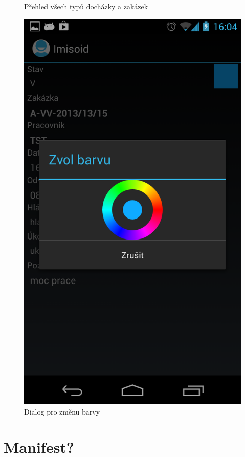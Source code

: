 \documentclass{diplomka}
\begin{document}
\begin{figure}[H]
\begin{minipage}{.45\textwidth}
   \caption{Přehled všech typů docházky a zakázek}
  \label{fig:colors}
\end{minipage}\hfill%
\begin{minipage}{.45\textwidth}
   \centering
 \includegraphics[width=.9\linewidth]{scr/changecolor.png}
   \caption{Dialog pro změnu barvy}
  \label{fig:changecolor}
\end{minipage}
\end{figure}


\chapter{Manifest?}
\end{document}
